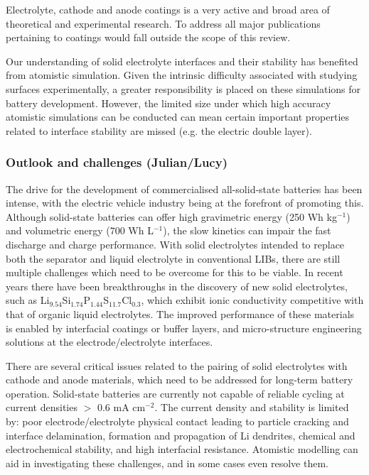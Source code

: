 \documentclass[../main.tex]{subfiles}
\begin{document}
Electrolyte, cathode and anode coatings is a very active and broad area of theoretical and experimental research. To address all major publications pertaining to coatings would fall outside the scope of this review. 

Our understanding of solid electrolyte interfaces and their stability has benefited from atomistic simulation. Given the intrinsic difficulty associated with studying surfaces experimentally, a greater responsibility is placed on these simulations for battery development. However, the limited size under which high accuracy atomistic simulations can be conducted can mean certain important properties related to interface stability are missed (e.g. the electric double layer\cite{Tateyama2019}).

\subsubsection{Outlook and challenges (Julian/Lucy)}
\label{sec:outlook_electrolytes}

The drive for the development of commercialised all-solid-state batteries has been intense, with the electric vehicle industry being at the forefront of promoting this.\cite{Woods_2021} Although solid-state batteries can offer high gravimetric energy (250 Wh kg$^{-1}$) and volumetric energy (700 Wh L$^{-1}$), the slow kinetics can impair the fast discharge and charge performance. With solid electrolytes intended to replace both the separator and liquid electrolyte in conventional LIBs, \cite{schnell2020solid} there are still multiple challenges which need to be overcome for this to be viable. In recent years there have been breakthroughs in the discovery of new solid electrolytes, such as Li$_{9.54}$Si$_{1.74}$P$_{1.44}$S$_{11.7}$Cl$_{0.3}$, \cite{kato2016high} which exhibit ionic conductivity competitive with that of organic liquid electrolytes. The improved performance of these materials is enabled by interfacial coatings or buffer layers, and micro-structure engineering solutions at the electrode/electrolyte interfaces.  \cite{kim2021solid}

There are several critical issues related to the pairing of solid electrolytes with cathode and anode materials, which need to be addressed for long-term battery operation. Solid-state batteries are currently not capable of reliable cycling at current densities $>$ 0.6 mA cm$^{-2}$\cite{famprikis_fundamentals_2019, Albertus2018}. The current density and stability is limited by: poor electrode/electrolyte physical contact leading to particle cracking and interface delamination, formation and propagation of Li dendrites, chemical and electrochemical stability, and high interfacial resistance. \cite{famprikis_fundamentals_2019} Atomistic modelling can aid in investigating these challenges, and in some cases even resolve them.
\end{document}
